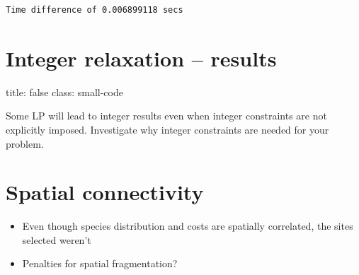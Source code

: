 \documentclass[
]{article}
\newenvironment{Shaded}{\begin{snugshade}}{\end{snugshade}}
\newcommand{\AttributeTok}[1]{\textcolor[rgb]{0.77,0.63,0.00}{#1}}
\newcommand{\DecValTok}[1]{\textcolor[rgb]{0.00,0.00,0.81}{#1}}
\newcommand{\FunctionTok}[1]{\textcolor[rgb]{0.00,0.00,0.00}{#1}}
\newcommand{\NormalTok}[1]{#1}
\newcommand{\OtherTok}[1]{\textcolor[rgb]{0.56,0.35,0.01}{#1}}
\newcommand{\SpecialCharTok}[1]{\textcolor[rgb]{0.00,0.00,0.00}{#1}}
\newcommand{\StringTok}[1]{\textcolor[rgb]{0.31,0.60,0.02}{#1}}
\providecommand{\tightlist}{%
  \setlength{\itemsep}{0pt}\setlength{\parskip}{0pt}}
\begin{document}
\begin{verbatim}
Time difference of 0.006899118 secs
\end{verbatim}

\hypertarget{integer-relaxation-results}{%
\section{Integer relaxation --
results}\label{integer-relaxation-results}}

title: false class: small-code

Some LP will lead to integer results even when integer constraints are
not explicitly imposed. Investigate why integer constraints are needed
for your problem.

\begin{Shaded}
\end{Shaded}

\hypertarget{spatial-connectivity}{%
\section{Spatial connectivity}\label{spatial-connectivity}}

\begin{itemize}
\tightlist
\item
  Even though species distribution and costs are spatially correlated,
  the sites selected weren't
\item
  Penalties for spatial fragmentation?
\end{itemize}
\end{document}
